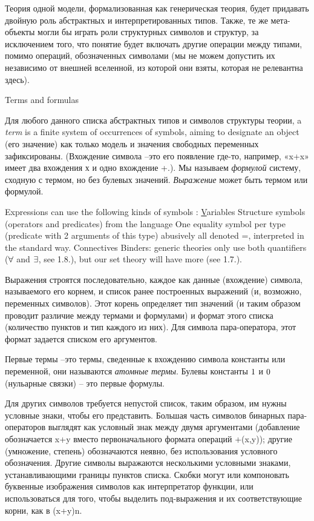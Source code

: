 Теория одной модели, формализованная как генерическая теория, будет придавать   двойную роль абстрактных и интерпретированных типов.  Также, те же мета-объекты могли бы играть роли структурных символов и структур, за исключением того, что понятие  будет включать другие операции между типами, помимо операций, обозначенных символами (мы не можем допустить их  независимо от внешней вселенной, из которой они взяты, которая не релевантна здесь).

{\sst Terms and formulas}


Для любого данного списка абстрактных типов и символов структуры теории, a {\it term} is a finite system of occurrences of symbols, aiming to designate an object (его значение) как только модель и значения свободных переменных зафиксированы. (Вхождение символа –это его появление где-то, например, «x+x» имеет два вхождения х и одно вхождение +.). Мы называем {\it формулой} систему, сходную с термом, но без булевых значений. {\it Выражение} может быть термом или формулой. 


Expressions can use the following kinds of symbols :
\ul Variables
\li Structure symbols (operators and predicates) from the language
\li One equality symbol per type (predicate with 2 arguments of this type) abusively all denoted =, interpreted in the standard way.
\li Connectives
\li Binders: generic theories only use both quantifiers ($\forall$ and $\exists$, see 1.8.), but our set theory will have more (see 1.7.).
\lu

Выражения строятся последовательно, каждое как данные (вхождение) символа, называемого его корнем, и список ранее построенных выражений (и, возможно, переменных символов). Этот корень определяет тип значений (и таким образом проводит различие между термами и формулами) и формат этого списка (количество пунктов и тип каждого из них). Для символа пара-оператора, этот формат задается списком его аргументов. 

Первые термы –это термы, сведенные к вхождению символа константы или переменной, они называются {\it атомные термы}. Булевы константы $1$ и $0$ (нульарные связки) – это первые формулы.

Для других символов требуется непустой список, таким образом, им нужны условные знаки, чтобы его представить. Большая часть символов бинарных пара-операторов выглядят как условный знак между двумя аргументами (добавление обозначается x+y вместо первоначального формата операций  +(x,y)); другие (умножение, степень) обозначаются неявно, без использования условного обозначения. 
Другие символы выражаются несколькими условными знаками, устанавливающими границы пунктов списка. Скобки могут или компоновать буквенные изображения символов как интерпретатор функции, или использоваться для того, чтобы выделить под-выражения и их соответствующие корни, как в (x+y)n.

